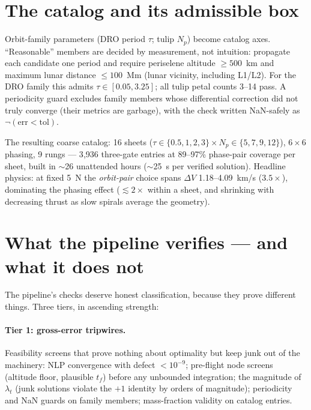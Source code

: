 \documentclass[11pt]{article}
\begin{document}
\section{The catalog and its admissible box}

Orbit-family parameters (DRO period $\tau$; tulip $N_p$) become catalog
axes. ``Reasonable'' members are decided by measurement, not intuition:
propagate each candidate one period and require periselene altitude
$\geq 500$~km and maximum lunar distance $\leq 100$~Mm (lunar vicinity,
including L1/L2). For the DRO family this admits $\tau\in[0.05,3.25]$; all
tulip petal counts 3--14 pass. A periodicity guard excludes family members
whose differential correction did not truly converge (their metrics are
garbage), with the check written NaN-safely as $\lnot(\text{err}<\text{tol})$.

The resulting coarse catalog: 16 sheets ($\tau\in\{0.5,1,2,3\}\times
N_p\in\{5,7,9,12\}$), $6\times6$ phasing, 9 rungs --- 3{,}936 three-gate
entries at 89--97\% phase-pair coverage per sheet, built in $\sim$26
unattended hours ($\sim$25~s per verified solution). Headline physics:
at fixed 5~N the \emph{orbit-pair} choice spans $\Delta V$
1.18--4.09~km/s ($3.5\times$), dominating the phasing effect
($\lesssim2\times$ within a sheet, and shrinking with decreasing thrust as
slow spirals average the geometry).

\section{What the pipeline verifies --- and what it does not}
\label{sec:checks}

The pipeline's checks deserve honest classification, because they prove
different things. Three tiers, in ascending strength:

\paragraph{Tier 1: gross-error tripwires.} Feasibility screens that prove
nothing about optimality but keep junk out of the machinery: NLP
convergence with defect $<10^{-9}$; pre-flight node screens (altitude
floor, plausible $t_f$) before any unbounded integration; the magnitude of
$\lambda_t$ (junk solutions violate the $+1$ identity by orders of
magnitude); periodicity and NaN guards on family members; mass-fraction
validity on catalog entries.
\end{document}
